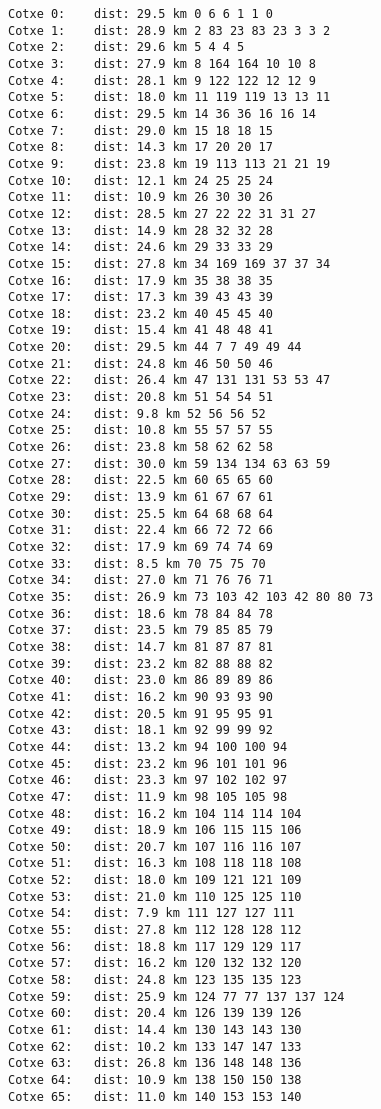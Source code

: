\documentclass[12]{article}
\begin{document}
\begin{lstlisting}[frame=single]
Cotxe 0:	dist: 29.5 km 0 6 6 1 1 0
Cotxe 1:	dist: 28.9 km 2 83 23 83 23 3 3 2
Cotxe 2:	dist: 29.6 km 5 4 4 5
Cotxe 3:	dist: 27.9 km 8 164 164 10 10 8
Cotxe 4:	dist: 28.1 km 9 122 122 12 12 9
Cotxe 5:	dist: 18.0 km 11 119 119 13 13 11
Cotxe 6:	dist: 29.5 km 14 36 36 16 16 14
Cotxe 7:	dist: 29.0 km 15 18 18 15
Cotxe 8:	dist: 14.3 km 17 20 20 17
Cotxe 9:	dist: 23.8 km 19 113 113 21 21 19
Cotxe 10:	dist: 12.1 km 24 25 25 24
Cotxe 11:	dist: 10.9 km 26 30 30 26
Cotxe 12:	dist: 28.5 km 27 22 22 31 31 27
Cotxe 13:	dist: 14.9 km 28 32 32 28
Cotxe 14:	dist: 24.6 km 29 33 33 29
Cotxe 15:	dist: 27.8 km 34 169 169 37 37 34
Cotxe 16:	dist: 17.9 km 35 38 38 35
Cotxe 17:	dist: 17.3 km 39 43 43 39
Cotxe 18:	dist: 23.2 km 40 45 45 40
Cotxe 19:	dist: 15.4 km 41 48 48 41
Cotxe 20:	dist: 29.5 km 44 7 7 49 49 44
Cotxe 21:	dist: 24.8 km 46 50 50 46
Cotxe 22:	dist: 26.4 km 47 131 131 53 53 47
Cotxe 23:	dist: 20.8 km 51 54 54 51
Cotxe 24:	dist: 9.8 km 52 56 56 52
Cotxe 25:	dist: 10.8 km 55 57 57 55
Cotxe 26:	dist: 23.8 km 58 62 62 58
Cotxe 27:	dist: 30.0 km 59 134 134 63 63 59
Cotxe 28:	dist: 22.5 km 60 65 65 60
Cotxe 29:	dist: 13.9 km 61 67 67 61
Cotxe 30:	dist: 25.5 km 64 68 68 64
Cotxe 31:	dist: 22.4 km 66 72 72 66
Cotxe 32:	dist: 17.9 km 69 74 74 69
Cotxe 33:	dist: 8.5 km 70 75 75 70
Cotxe 34:	dist: 27.0 km 71 76 76 71
Cotxe 35:	dist: 26.9 km 73 103 42 103 42 80 80 73
Cotxe 36:	dist: 18.6 km 78 84 84 78
Cotxe 37:	dist: 23.5 km 79 85 85 79
Cotxe 38:	dist: 14.7 km 81 87 87 81
Cotxe 39:	dist: 23.2 km 82 88 88 82
Cotxe 40:	dist: 23.0 km 86 89 89 86
Cotxe 41:	dist: 16.2 km 90 93 93 90
Cotxe 42:	dist: 20.5 km 91 95 95 91
Cotxe 43:	dist: 18.1 km 92 99 99 92
Cotxe 44:	dist: 13.2 km 94 100 100 94
Cotxe 45:	dist: 23.2 km 96 101 101 96
Cotxe 46:	dist: 23.3 km 97 102 102 97
Cotxe 47:	dist: 11.9 km 98 105 105 98
Cotxe 48:	dist: 16.2 km 104 114 114 104
Cotxe 49:	dist: 18.9 km 106 115 115 106
Cotxe 50:	dist: 20.7 km 107 116 116 107
Cotxe 51:	dist: 16.3 km 108 118 118 108
Cotxe 52:	dist: 18.0 km 109 121 121 109
Cotxe 53:	dist: 21.0 km 110 125 125 110
Cotxe 54:	dist: 7.9 km 111 127 127 111
Cotxe 55:	dist: 27.8 km 112 128 128 112
Cotxe 56:	dist: 18.8 km 117 129 129 117
Cotxe 57:	dist: 16.2 km 120 132 132 120
Cotxe 58:	dist: 24.8 km 123 135 135 123
Cotxe 59:	dist: 25.9 km 124 77 77 137 137 124
Cotxe 60:	dist: 20.4 km 126 139 139 126
Cotxe 61:	dist: 14.4 km 130 143 143 130
Cotxe 62:	dist: 10.2 km 133 147 147 133
Cotxe 63:	dist: 26.8 km 136 148 148 136
Cotxe 64:	dist: 10.9 km 138 150 150 138
Cotxe 65:	dist: 11.0 km 140 153 153 140

\end{lstlisting}
\end{document}
